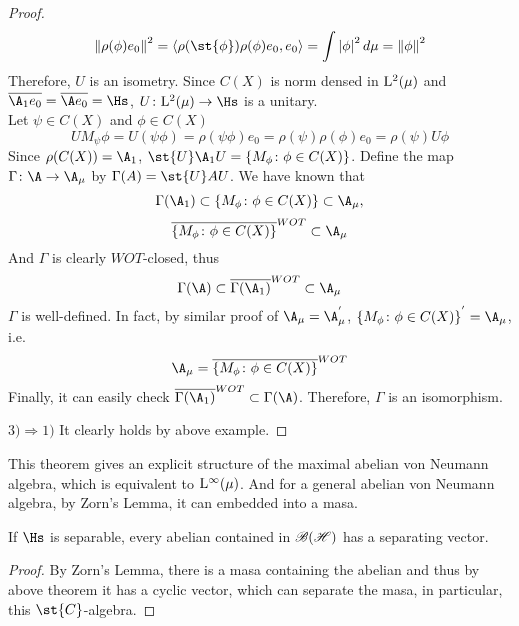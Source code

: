 \begin{proof}
	\begin{equation*}
		\norm{\rho(\phi)e_0}^2 = \langle \rho(\st{\phi})\rho(\phi)e_0,e_0 \rangle = \int \abs{\phi}^2 d \mu = \norm{\phi}^2
	\end{equation*}
	Therefore, $U$ is an isometry. Since $C(X)$ is norm densed in $\mathrm{L^{2}}(\mu)$ and $\clo{\A_1 e_0} = \clo{\A e_0} = \Hs$, $U \colon \lfs{2}(\mu) \sto \Hs$ is a unitary. \\
	Let $\psi \in C(X)$ and $\phi \in C(X)$
	\begin{equation*}
		UM_{\psi}\phi = U(\psi\phi) = \rho(\psi\phi)e_0 = \rho(\psi) \rho(\phi)e_0 = \rho(\psi) U \phi  
	\end{equation*}
	Since $\rho(C(X)) = \A_1$, $\st{U} \A_1 U = \{M_{\phi} \colon \phi \in C(X)\}$.
	Define the map $\Gamma \colon \A \sto \A_{\mu}$ by $\Gamma(A) = \st{U} A U$. We have known that
	\begin{equation*}
		 \Gamma(\A_1) \subset \{M_{\phi} \colon \phi \in C(X)\} \subset \A_{\mu},
	\end{equation*}
	\begin{equation*}
		\clo{\{M_{\phi} \colon \phi \in C(X)\}}^{WOT} \subset \A_{\mu}
	\end{equation*}
	And $\Gamma$ is clearly $WOT$-closed, thus 
	\begin{equation*}
		\Gamma(\A) \subset \clo{\Gamma(\A_1)}^{WOT} \subset \A_{\mu}
	\end{equation*}
	$\Gamma$ is well-defined.
	In fact, by similar proof of $\A_{\mu}=\A_{\mu}^{'}$, ${\{M_{\phi} \colon \phi \in C(X)\}}^{'} = \A_{\mu}$, i.e. 
	\begin{equation*}
		\A_{\mu} = \clo{\{M_{\phi} \colon \phi \in C(X)\}}^{WOT}
	\end{equation*}
	Finally, it can easily check $\clo{\Gamma(\A_1)}^{WOT} \subset \Gamma(\A)$. Therefore, $\Gamma$ is an isomorphism.
	\item $3) \Rightarrow 1)$ It clearly holds by above example.
\end{proof}

This theorem gives an explicit structure of the maximal abelian von Neumann algebra, which is equivalent to $\mathrm{L^{\infty}}(\mu)$. And for a general abelian von Neumann algebra, by Zorn's Lemma, it can embedded into a masa.

\begin{cor} \label{cor9}
	If $\Hs$ is separable, every abelian \Cs contained in $\mathscr{B(H)}$ has a separating vector.
\end{cor}
\begin{proof}
	By Zorn's Lemma, there is a masa containing the abelian \Cs and thus by above theorem it has a cyclic vector, which can separate the masa, in particular, this $\st{C}$-algebra.
\end{proof}

